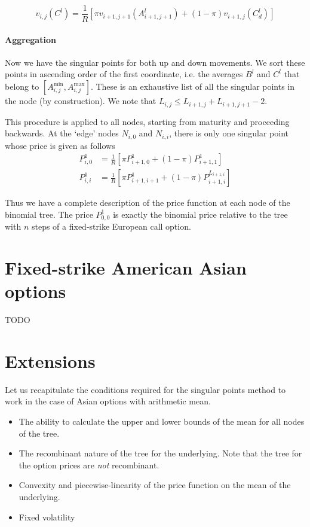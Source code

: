 \begin{equation}
	\label{eq:sp-asian-dn-pr}
	v_{i,j}( C^l ) = \frac{1}{R} \left[ \pi v_{i+1,j+1} \left( A_{i+1,j+1}^l \right) + (1 - \pi) v_{i+1,j} \left( C^l_d \right) \right]
\end{equation}


\paragraph{Aggregation}

Now we have the singular points for both up and down movements. We sort these points in ascending order of the first coordinate, i.e. the averages $ B^l $ and $ C^l $ that belong to $ \left[ A_{i,j}^{\min}, A_{i,j}^{\max} \right] $. These is an exhaustive list of all the singular points in the node (by construction). We note that $ L_{i,j} \le L_{i+1,j} + L_{i+1,j+1} - 2 $.

This procedure is applied to all nodes, starting from maturity and proceeding backwards. At the `edge' nodes $ N_{i,0} $ and $ N_{i,i} $, there is only one singular point whose price is given as follows
\begin{subequations}
	\label{eq:sp-asian-terminal-nodes}
	\begin{align}
		P_{i,0}^1 &= \frac{1}{R} \left[ \pi P_{i+1,0}^1 + (1 - \pi) P_{i+1,1}^1 \right] \\
		P_{i,i}^1 &= \frac{1}{R} \left[ \pi P_{i+1,i+1}^1 + (1 - \pi) P_{i+1,i}^{L_{i+1,i}} \right]
	\end{align}
\end{subequations}

Thus we have a complete description of the price function at each node of the binomial tree. The price $ P_{0,0}^1 $ is exactly the binomial price relative to the tree with $n$ steps of a fixed-strike European call option.


\section{Fixed-strike American Asian options}
\label{sec:fixed-strike-am}



TODO
\clearpage


\section{Extensions}
\label{sec:sp-asian-extensions}

Let us recapitulate the conditions required for the singular points method to work in the case of Asian options with arithmetic mean.
\begin{itemize}
\item The ability to calculate the upper and lower bounds of the mean for all nodes of the tree.
\item The recombinant nature of the tree for the underlying. Note that the tree for the option prices are \emph{not} recombinant.
\item Convexity and piecewise-linearity of the price function on the mean of the underlying.
\item Fixed volatility
\end{itemize}

